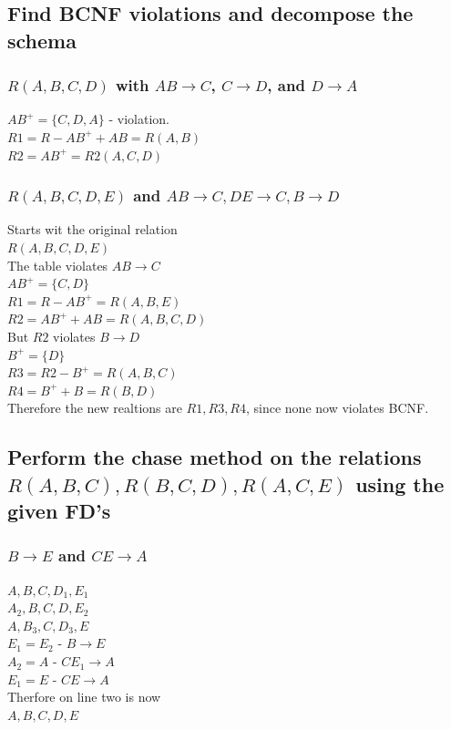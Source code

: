 \documentclass[12pt, a4paper]{article}
\begin{document}
		\subsection{Find BCNF violations and decompose the schema}
			\subsubsection{$R(A,B,C,D)$ with $AB\rightarrow C$, $C\rightarrow D$, and $D\rightarrow A$}
				$AB^+=\{C,D,A\}$ - violation.\\
				$R1=R-AB^++AB=R(A,B)$\\
				$R2=AB^+=R2(A,C,D)$
			\subsubsection{$R(A,B,C,D,E)$ and $AB\rightarrow C, DE\rightarrow C, B\rightarrow D$}
				Starts wit the original relation\\
				$R(A,B,C,D,E)$\\
				The table violates $AB\rightarrow C$\\
				$AB^+=\{C,D\}$\\
				$R1=R-AB^+=R(A,B,E)$\\
				$R2=AB^++AB=R(A,B,C,D)$\\
				But $R2$ violates $B\rightarrow D$\\
				$B^+=\{D\}$\\
				$R3=R2-B^+=R(A,B,C)$\\
				$R4=B^++B=R(B,D)$\\
				Therefore the new realtions are $R1,R3,R4$, since none now violates BCNF.
				\subsection{Perform the chase method on the relations $R(A,B,C),R(B,C,D),R(A,C,E)$ using the given FD's}
					\subsubsection{$B\rightarrow E$ and $CE\rightarrow A$}
						$A,B,C,D_1,E_1$\\
						$A_2,B,C,D,E_2$\\
						$A,B_3,C,D_3,E$\\
						$E_1=E_2$ - $B\rightarrow E$\\
						$A_2=A$ - $CE_1 \rightarrow A$\\
						$E_1=E$ - $CE \rightarrow A$\\
						Therfore on line two is now\\
						$A,B,C,D,E$
\end{document}
